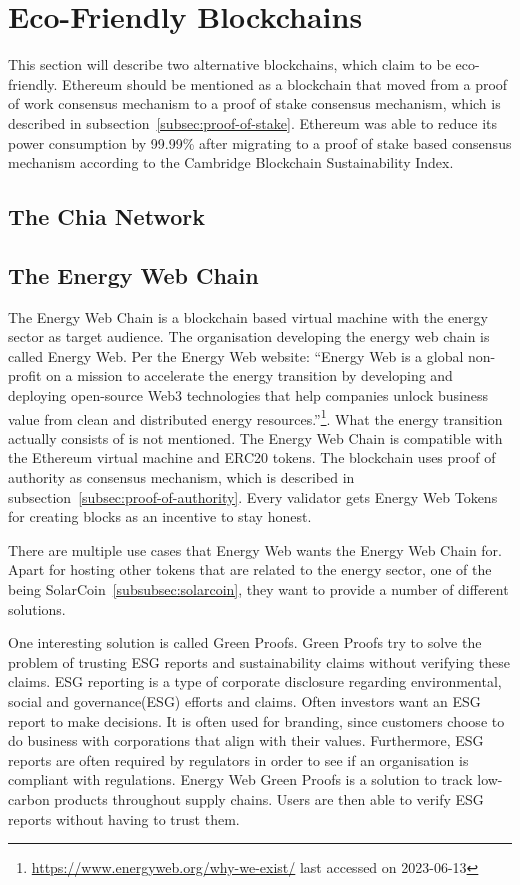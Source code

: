 
\section{Eco-Friendly Blockchains}\label{sec:alternative-blockchains}
This section will describe two alternative blockchains, which claim to be eco-friendly.
Ethereum should be mentioned as a blockchain that moved from a proof of work consensus mechanism to a proof of stake consensus mechanism, which is described in subsection\ \ref{subsec:proof-of-stake}.
Ethereum was able to reduce its power consumption by 99.99\% after migrating to a proof of stake based consensus mechanism according to the Cambridge Blockchain Sustainability Index.\cite{CBECI}

\subsection{The Chia Network}\label{subsec:chia}

\subsection{The Energy Web Chain}\label{subsec:the-energy-web-chain}
The Energy Web Chain is a blockchain based virtual machine with the energy sector as target audience.
The organisation developing the energy web chain is called Energy Web.
Per the Energy Web website: ``Energy Web is a global non-profit on a mission to accelerate the energy transition by developing and deploying open-source Web3 technologies that help companies unlock business value from clean and distributed energy resources.''\footnote{\url{https://www.energyweb.org/why-we-exist/} last accessed on 2023-06-13}.
What the energy transition actually consists of is not mentioned.
The Energy Web Chain is compatible with the Ethereum virtual machine and ERC20 tokens.
The blockchain uses proof of authority as consensus mechanism, which is described in subsection\ \ref{subsec:proof-of-authority}.
Every validator gets Energy Web Tokens for creating blocks as an incentive to stay honest.\cite{kraken-ewc}

There are multiple use cases that Energy Web wants the Energy Web Chain for.
Apart for hosting other tokens that are related to the energy sector, one of the being SolarCoin\ \ref{subsubsec:solarcoin}, they want to provide a number of different solutions.

One interesting solution is called Green Proofs.
Green Proofs try to solve the problem of trusting ESG reports and sustainability claims without verifying these claims.
ESG reporting is a type of corporate disclosure regarding environmental, social and governance(ESG) efforts and claims.
Often investors want an ESG report to make decisions.
It is often used for branding, since customers choose to do business with corporations that align with their values.
Furthermore, ESG reports are often required by regulators in order to see if an organisation is compliant with regulations.
Energy Web Green Proofs is a solution to track low-carbon products throughout supply chains.
Users are then able to verify ESG reports without having to trust them.\cite{ESG-reporting, EW-green-proofs}

